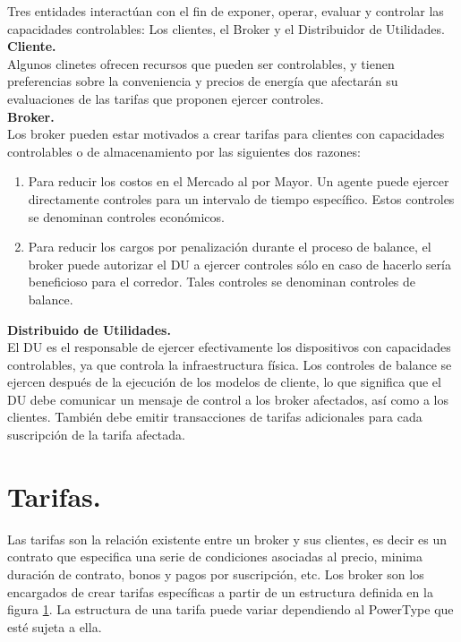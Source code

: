 Tres entidades interactúan con el fin de exponer, operar, evaluar y controlar las capacidades controlables: Los clientes, el Broker y el Distribuidor de Utilidades.\\

\textbf{Cliente.}\\

Algunos clinetes ofrecen recursos que pueden ser controlables, y tienen preferencias sobre la conveniencia y precios de energía que afectarán su evaluaciones de las tarifas que proponen ejercer controles.\\

\textbf{Broker.}\\

Los broker pueden estar motivados a crear tarifas para clientes con capacidades controlables o de almacenamiento por las siguientes dos razones:

\begin{enumerate}
	\item Para reducir los costos en el Mercado al por Mayor. Un agente puede ejercer directamente controles para un intervalo de tiempo específico. Estos controles se denominan controles económicos.
	\item Para reducir los cargos por penalización durante el proceso de balance, el broker puede autorizar el DU a ejercer controles sólo en caso de hacerlo sería beneficioso para el corredor. Tales controles se denominan controles de balance.
\end{enumerate}

\textbf{Distribuido de Utilidades.}\\

El DU es el responsable de ejercer efectivamente los dispositivos con capacidades controlables, ya que controla la infraestructura física. Los controles de balance se ejercen después de la ejecución de los modelos de cliente, lo que significa que el DU debe comunicar un mensaje de control a los broker afectados, así como a los clientes. También debe emitir transacciones de tarifas adicionales para cada suscripción de la tarifa afectada.

\section{Tarifas.}
\label{tariff}
Las tarifas son la relación existente entre un broker y sus clientes, es decir es un contrato que especifica una serie de condiciones asociadas al precio, minima duración de contrato, bonos y pagos por suscripción, etc. Los broker son los encargados de crear tarifas específicas a partir de un estructura definida  en la figura \ref{tariff}. La estructura de una tarifa puede variar dependiendo al PowerType que esté sujeta a ella.

